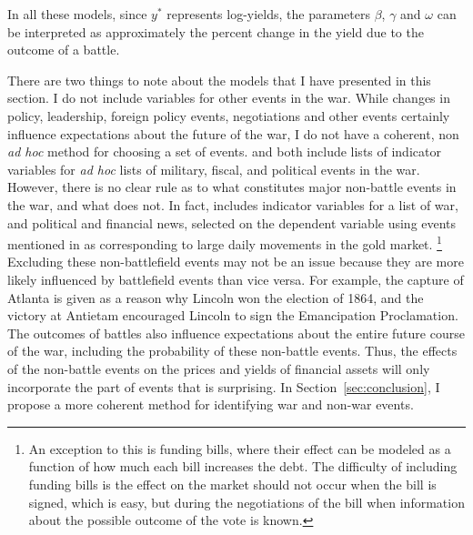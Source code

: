 In all these models, since $y^{*}$ represents log-yields, the parameters $\beta$, $\gamma$ and $\omega$ can be interpreted as approximately the percent change in the yield due to the outcome of a battle.

There are two things to note about the models that I have presented in this section.
I do not include variables for other events in the war.
While changes in policy, leadership, foreign policy events, negotiations and other events certainly influence expectations about the future of the war, I do not have a coherent, non \textit{ad hoc} method for choosing a set of events.
\textcite{McCandless1996} and \textcite{SmithSmith1997} both include lists of indicator variables for \textit{ad hoc} lists of military, fiscal, and political events in the war.
However, there is no clear rule as to what constitutes major non-battle events in the war, and what does not.
In fact, \textcite{SmithSmith1997} includes indicator variables for a list of war, and political and financial news, selected on the dependent variable using events mentioned in \textcite{Mitchell1903} as corresponding to large daily movements in the gold market.%
\footnote{
  An exception to this is funding bills, where their effect can be modeled as a function of how much each bill increases the debt.
  The difficulty of including funding bills is the effect on the market should not occur when the bill is signed, which is easy, but during the negotiations of the bill when information about the possible outcome of the vote is known.
}
Excluding these non-battlefield events may not be an issue because they are more likely influenced by battlefield events than vice versa.
For example, the capture of Atlanta is given as a reason why Lincoln won the election of 1864, and the victory at Antietam encouraged Lincoln to sign the Emancipation Proclamation.
The outcomes of battles also influence expectations about the entire future course of the war, including the probability of these non-battle events.
Thus, the effects of the non-battle events on the prices and yields of financial assets will only incorporate the part of events that is surprising.
In Section~\ref{sec:conclusion}, I propose a more coherent method for identifying war and non-war events.

